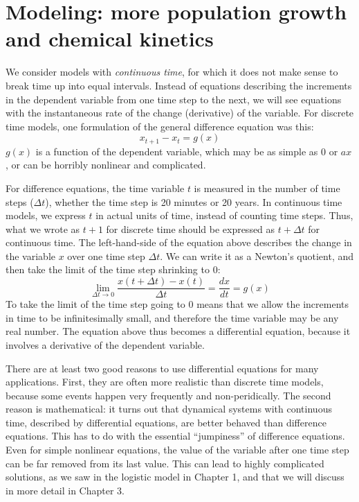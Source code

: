 \documentclass[11pt]{book}
\begin{document}
\section{Modeling: more population growth and chemical kinetics}
We consider models with \emph{continuous time}, for which it does not make sense to break time up into equal intervals. Instead of equations describing the increments in the dependent variable from one time step to the next, we will see equations with the instantaneous rate of the change (derivative) of the variable. For discrete time models, one formulation of the general difference equation was this:
$$ x_{t+1} - x_t = g(x)$$
$g(x)$ is a function of the dependent variable, which may be as simple as 0 or $ax$, or can be horribly nonlinear and complicated.

For difference equations, the time variable $t$ is measured in the number of time steps ($\Delta t$), whether the time step is 20 minutes or 20 years. In continuous time models, we express $t$ in actual units of time, instead of counting time steps. Thus, what we wrote as $t+1$ for discrete time should be expressed as $t+\Delta t$ for continuous time. The left-hand-side of the equation above describes the change in the variable $x$ over one time step $\Delta t$. We can write it as a Newton's quotient, and then take the limit of the time step shrinking to 0:
$$ \lim_{\Delta t \rightarrow 0} \frac{x(t +\Delta t) - x(t)} {\Delta t} = \frac{d x} {dt}  = g(x)  $$
To take the limit of the time step going to 0 means that we allow the increments in time to be infinitesimally small, and therefore the time variable may be any real number. The equation above thus becomes a differential equation, because it involves a derivative of the dependent variable.

There are at least two good reasons to use differential equations for many applications. First,  they are often more realistic than discrete time models, because some events happen very frequently and non-peridically. The second reason is mathematical: it turns out that dynamical systems with continuous time, described by differential equations, are better behaved than difference equations. This has to do with the essential ``jumpiness'' of difference equations. Even for simple nonlinear equations, the value of the variable after one time step can be far removed from its last value. This can lead to highly complicated solutions, as we saw in the logistic model in Chapter 1, and that we will discuss in more detail in Chapter 3.
\end{document}
